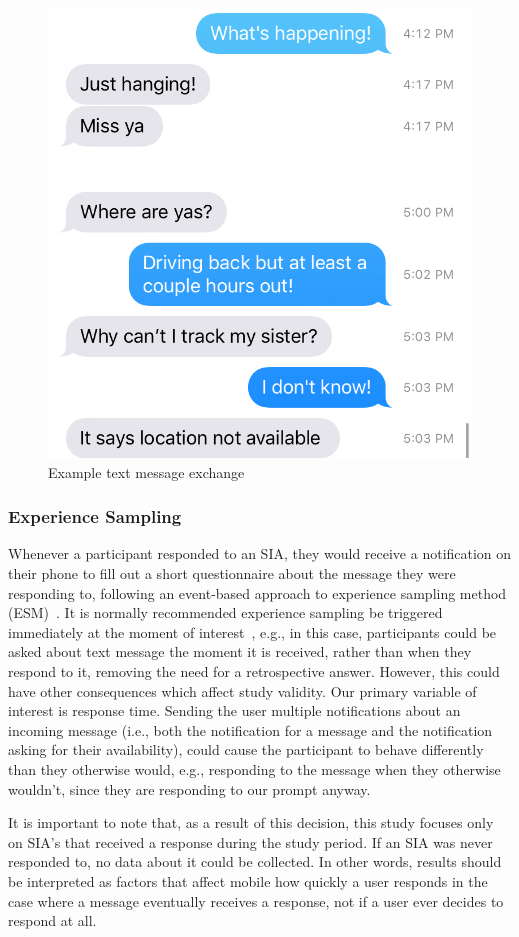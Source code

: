 \documentclass[12pt]{nuthesis}	%
\begin{document}
\begin{figure}[h]
\centering
\includegraphics[width=.7\textwidth]{figures/sia2}
\caption{Example text message exchange}
\label{fig:sia2}
\end{figure}


\subsubsection{Experience Sampling}
\label{sec:esm}

Whenever a participant responded to an SIA, they would receive a notification on their phone to fill out a short questionnaire about the message they were responding to, following an event-based approach to experience sampling method (ESM)~\citep{conner2009experience,csikszentmihalyi2014validity}. It is normally recommended experience sampling  be triggered immediately at the moment of interest~\citep{hormuth1986sampling}, e.g., in this case, participants could be asked about text message the moment it is received, rather than when they respond to it, removing the need for a retrospective answer. However, this could have other consequences which affect study validity. Our primary variable of interest is response time. Sending the user multiple notifications about an incoming message (i.e., both the notification for a message and the notification asking for their availability), could cause the participant to behave differently than they otherwise would, e.g., responding to the message when they otherwise wouldn't, since they are responding to our prompt anyway.

It is important to note that, as a result of this decision, this study focuses only on SIA's that received a response during the study period. If an SIA was never responded to, no data about it could be collected. In other words, results should be interpreted as factors that affect mobile how quickly a user responds in the case where a message eventually receives a response, not if a user ever decides to respond at all.
\end{document}
